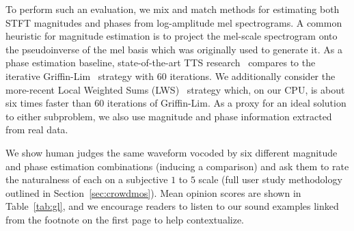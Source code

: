 \documentclass[a4paper]{article}
\begin{document}
To perform such an evaluation, we mix and match methods for estimating both STFT magnitudes and phases from log-amplitude mel spectrograms. 
A common heuristic for magnitude estimation is to project the mel-scale spectrogram onto the pseudoinverse of the mel basis which was originally used to generate it. 
As a phase estimation baseline, state-of-the-art TTS research~\cite{ping2017deep,shen2018natural} compares to the iterative Griffin-Lim~\cite{griffinlim} strategy with $60$ iterations. 
We additionally consider the more-recent Local Weighted Sums (LWS)~\cite{lws} strategy which, on our CPU, is about six times faster than $60$ iterations of Griffin-Lim.
As a proxy for an ideal solution to either subproblem, 
we also use magnitude and phase information extracted from real data. 

We show human judges the same waveform vocoded by six different magnitude and phase estimation combinations (inducing a comparison) and ask them to rate the naturalness of each on a subjective $1$ to $5$ scale (full user study methodology outlined in Section~\ref{sec:crowdmos}). 
Mean opinion scores are shown in Table~\ref{tab:gl}, and we encourage readers to listen to our sound examples linked from the footnote on the first page to help contextualize.
\end{document}
